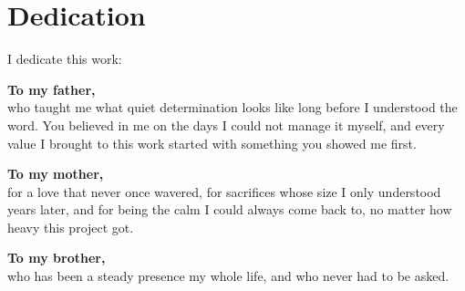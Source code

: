 \documentclass[12pt,a4paper,oneside]{report}
\begin{document}






\chapter*{Dedication}


\vspace{1cm}


\noindent I dedicate this work:

\vspace{0.6cm}

\noindent\textbf{To my father,}\\
who taught me what quiet determination looks like long before I understood
the word. You believed in me on the days I could not manage it myself, and
every value I brought to this work started with something you showed me first.

\vspace{0.5cm}

\noindent\textbf{To my mother,}\\
for a love that never once wavered, for sacrifices whose size I only
understood years later, and for being the calm I could always come back to,
no matter how heavy this project got.

\vspace{0.5cm}

\noindent\textbf{To my brother,}\\
who has been a steady presence my whole life, and who never had to be asked.
\end{document}
